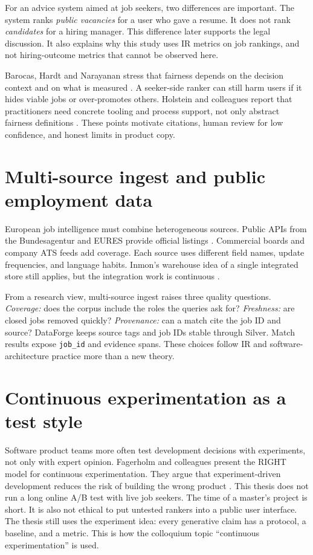 For an advice system aimed at job seekers, two differences are important. The system ranks \emph{public vacancies} for a user who gave a resume. It does not rank \emph{candidates} for a hiring manager. This difference later supports the legal discussion. It also explains why this study uses IR metrics on job rankings, and not hiring-outcome metrics that cannot be observed here.

Barocas, Hardt and Narayanan stress that fairness depends on the decision context and on what is measured . A seeker-side ranker can still harm users if it hides viable jobs or over-promotes others. Holstein and colleagues report that practitioners need concrete tooling and process support, not only abstract fairness definitions . These points motivate citations, human review for low confidence, and honest limits in product copy.

\section{Multi-source ingest and public employment data}
\label{sec:multisource}

European job intelligence must combine heterogeneous sources. Public APIs from the Bundesagentur and EURES provide official listings . Commercial boards and company ATS feeds add coverage. Each source uses different field names, update frequencies, and language habits. Inmon's warehouse idea of a single integrated store still applies, but the integration work is continuous .

From a research view, multi-source ingest raises three quality questions. \emph{Coverage:} does the corpus include the roles the queries ask for? \emph{Freshness:} are closed jobs removed quickly? \emph{Provenance:} can a match cite the job ID and source? DataForge keeps source tags and job IDs stable through Silver. Match results expose \texttt{job\_id} and evidence spans. These choices follow IR and software-architecture practice more than a new theory.

\section{Continuous experimentation as a test style}
\label{sec:experimentation}

Software product teams more often test development decisions with experiments, not only with expert opinion. Fagerholm and colleagues present the RIGHT model for continuous experimentation. They argue that experiment-driven development reduces the risk of building the wrong product . This thesis does not run a long online A/B test with live job seekers. The time of a master's project is short. It is also not ethical to put untested rankers into a public user interface. The thesis still uses the experiment idea: every generative claim has a protocol, a baseline, and a metric. This is how the colloquium topic ``continuous experimentation'' is used.

